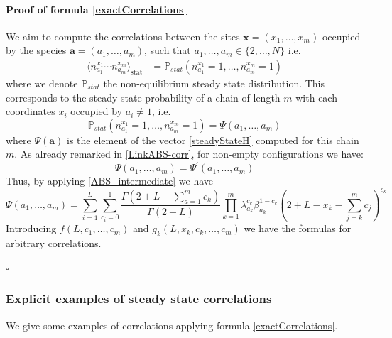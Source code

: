\documentclass[11pt]{article}
\numberwithin{equation}{section}
\numberwithin{equation}{subsection}
\begin{document}
 \paragraph{Proof of formula \eqref{exactCorrelations}}
 We aim to compute the correlations between the sites $\mathbf{x}=\left(x_{1},\ldots,x_{m}\right)$ occupied by the species $\mathbf{a}=\left(a_{1},\ldots,a_{m}\right)$, such that $a_{1},\ldots,a_{m}\in \{2,\ldots,N\}$ i.e. 
\begin{equation}\label{Prob-m}
	\begin{split}
		\langle n_{a_{1}}^{x_{1}}\cdots n_{a_{m}}^{x_{m}}\rangle_{\text{stat}}&
		=\mathbb{P}_{stat}\left(n_{a_{1}}^{x_{1}}=1,\ldots,n_{a_{m}}^{x_{m}}=1\right)
	\end{split}
\end{equation}
where we denote $\mathbb{P}_{stat}$ the non-equilibrium steady state distribution. 
This corresponds to the steady state probability of a chain of length $m$ with each coordinates $x_{i}$ occupied by $a_{i}\neq 1$, i.e. 
\begin{equation}
	\mathbb{P}_{stat}\left(n_{a_{1}}^{x_{1}}=1,\ldots,n_{a_{m}}^{x_{m}}=1\right)=\Psi\left(a_{1},\ldots,a_{m}\right)
\end{equation}
where $\Psi(\bm{a})$ is the element of the vector \eqref{steadyStateH} computed for this chain $m$.
As already remarked in \eqref{LinkABS-corr}, for non-empty configurations we have:
\begin{equation}\label{Corr-mABS}
	\Psi(a_{1},\ldots,a_{m})=\Psi^{'}(a_{1},\ldots,a_{m})
\end{equation}
Thus, by applying \eqref{ABS_intermediate} we have 
\begin{equation}
	\Psi(a_{1},\ldots,a_{m})=\sum_{i=1}^{L}\sum_{c_{i}=0}^{1}\frac{\Gamma(2+L-\sum_{a=1}^{m}c_{k})}{\Gamma(2+L)}\prod_{k=1}^{m}\lambda_{a_{k}}^{c_{k}}\beta_{a_{k}}^{1-c_{k}}\left(2+L-x_{k}-\sum_{j=k}^{m}c_{j}\right)^{c_{k}}
\end{equation}
Introducing $f(L,c_{1},\ldots,c_{m})$ and $g_{k}(L,x_{k},c_{k},\ldots,c_{m})$ we have the formulas for arbitrary correlations.
\begin{flushright}
    $\square$
\end{flushright}
\subsubsection{Explicit examples of steady state correlations}
We give some examples of correlations applying formula \eqref{exactCorrelations}.
\end{document}
